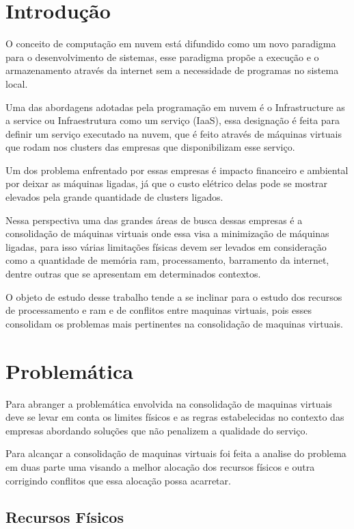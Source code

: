 \chapter*[Introdução]{Introdução}

O conceito de computação em nuvem está difundido como um novo paradigma para o desenvolvimento de sistemas, esse paradigma propõe a execução e o armazenamento através da internet sem a necessidade de programas no sistema local.

Uma das abordagens adotadas pela programação em nuvem é o Infrastructure as a service ou Infraestrutura como um serviço (IaaS), essa designação é feita para  definir um serviço executado na nuvem, que é feito através de máquinas virtuais que rodam nos clusters das empresas que disponibilizam esse serviço.

Um dos problema enfrentado por essas empresas é impacto financeiro e ambiental por deixar as máquinas ligadas, já que o custo elétrico delas pode se mostrar elevados pela grande quantidade de clusters ligados.

Nessa perspectiva uma das grandes áreas de busca dessas empresas é a consolidação de máquinas virtuais onde essa visa a minimização de máquinas ligadas, para isso várias limitações físicas devem ser levados em consideração como a quantidade de memória ram, processamento, barramento da internet, dentre outras que se apresentam em determinados contextos.

O objeto de estudo desse trabalho tende a se inclinar para o estudo dos recursos de processamento e ram e de conflitos entre maquinas virtuais, pois esses consolidam os problemas mais pertinentes na consolidação de maquinas virtuais.


\chapter{Problemática}

Para abranger a problemática envolvida na consolidação de maquinas virtuais deve se levar em conta os limites físicos e as regras estabelecidas no contexto das empresas abordando soluções que não penalizem a qualidade do serviço.

Para alcançar a consolidação de maquinas virtuais foi feita a analise do problema em duas parte uma visando a melhor alocação dos recursos físicos e outra corrigindo conflitos que essa alocação possa acarretar. 

\section{Recursos Físicos}

